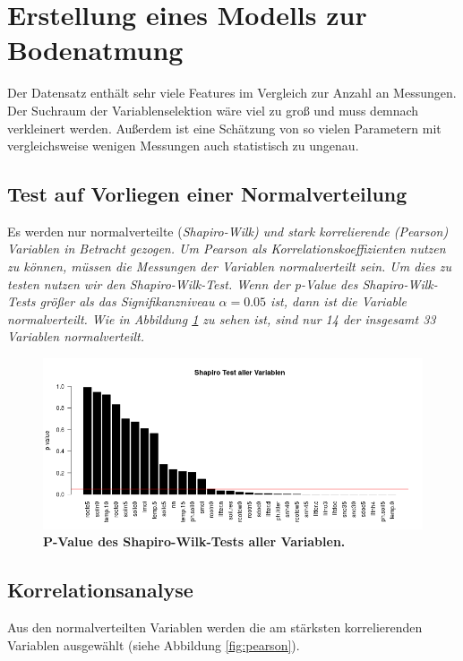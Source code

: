 \section{Erstellung eines Modells zur Bodenatmung}
\label{sec-model}

Der Datensatz enthält sehr viele Features im Vergleich zur Anzahl an Messungen.
Der Suchraum der Variablenselektion wäre viel zu groß und muss demnach verkleinert werden.
Außerdem ist eine Schätzung von so vielen Parametern mit vergleichsweise wenigen Messungen auch statistisch zu ungenau.

\subsection{Test auf Vorliegen einer Normalverteilung}

Es werden nur normalverteilte (\it{Shapiro-Wilk}) und stark korrelierende (\it{Pearson}) Variablen in Betracht gezogen. Um \it{Pearson} als Korrelationskoeffizienten nutzen zu können, müssen die Messungen der Variablen normalverteilt sein. Um dies zu testen nutzen wir den \it{Shapiro-Wilk-Test}. Wenn der \it{p-Value} des \it{Shapiro-Wilk-Tests} größer als das Signifikanzniveau $\alpha=0.05$ ist, dann ist die Variable normalverteilt. Wie in Abbildung \ref{fig:shapiro} zu sehen ist, sind nur 14 der insgesamt 33 Variablen normalverteilt.

\begin{figure}[ht]
	\centering
	\includegraphics[width=\textwidth]{fig/model/normalverteilung-shapiro.png}
	\caption{\bf{P-Value des Shapiro-Wilk-Tests aller Variablen.}}
	\label{fig:shapiro}
\end{figure}

\subsection{Korrelationsanalyse}

Aus den normalverteilten Variablen werden die am stärksten korrelierenden Variablen ausgewählt (siehe Abbildung \ref{fig:pearson}). 

